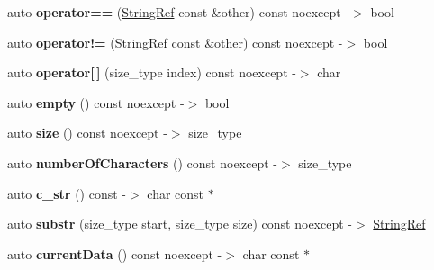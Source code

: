 \begin{DoxyCompactItemize}
\item 
\mbox{\label{class_catch_1_1_string_ref_aabb30149ab961187e4b3ff3394bf6e73}} 
auto {\bfseries operator==} (\mbox{\hyperlink{class_catch_1_1_string_ref}{String\+Ref}} const \&other) const noexcept -\/$>$ bool
\item 
\mbox{\label{class_catch_1_1_string_ref_aaa6c8bf61c4628034c19763d1c8ad215}} 
auto {\bfseries operator!=} (\mbox{\hyperlink{class_catch_1_1_string_ref}{String\+Ref}} const \&other) const noexcept -\/$>$ bool
\item 
\mbox{\label{class_catch_1_1_string_ref_a4ba2e01eec1f0f56c257d213c796ab3b}} 
auto {\bfseries operator\mbox{[}$\,$\mbox{]}} (size\+\_\+type index) const noexcept -\/$>$ char
\item 
\mbox{\label{class_catch_1_1_string_ref_ac6b68b9dc1e1dec69e884e3f7be581bd}} 
auto {\bfseries empty} () const noexcept -\/$>$ bool
\item 
\mbox{\label{class_catch_1_1_string_ref_ae084d72cb2952cee61a63ef36611d0ad}} 
auto {\bfseries size} () const noexcept -\/$>$ size\+\_\+type
\item 
\mbox{\label{class_catch_1_1_string_ref_a6a6cac7430e626ffdd7550a081e8168f}} 
auto {\bfseries number\+Of\+Characters} () const noexcept -\/$>$ size\+\_\+type
\item 
\mbox{\label{class_catch_1_1_string_ref_a1669cb2765e820ca258159676cbd82a5}} 
auto {\bfseries c\+\_\+str} () const -\/$>$ char const $\ast$
\item 
\mbox{\label{class_catch_1_1_string_ref_a248568b467cf6599320903ae613c8eee}} 
auto {\bfseries substr} (size\+\_\+type start, size\+\_\+type size) const noexcept -\/$>$ \mbox{\hyperlink{class_catch_1_1_string_ref}{String\+Ref}}
\item 
\mbox{\label{class_catch_1_1_string_ref_aee240387305ca8b249169d79f36e7002}} 
auto {\bfseries current\+Data} () const noexcept -\/$>$ char const $\ast$
\end{DoxyCompactItemize}
